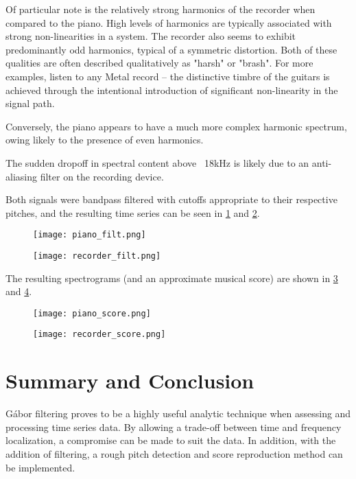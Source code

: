 \documentclass[journal]{IEEEtran}
\begin{document}
Of particular note is the relatively strong harmonics of the recorder when compared to the piano. High levels of harmonics
are typically associated with strong non-linearities in a system. The recorder also seems to exhibit predominantly
odd harmonics, typical of a symmetric distortion. Both of these qualities are often described qualitatively as 
"harsh" or "brash". For more examples, listen to any Metal record -- the distinctive timbre of the guitars is achieved
through the intentional introduction of significant non-linearity in the signal path.

Conversely, the piano appears to have a much more complex harmonic spectrum, owing likely to the presence of even
harmonics.

The sudden dropoff in spectral content above ~18kHz is likely due to an anti-aliasing filter on the recording device.

Both signals were bandpass filtered with cutoffs appropriate to their respective pitches, and the resulting time series can be seen in \ref{piano_filt} and \ref{recorder_filt}.
\begin{figure}
	\centerline{\texttt{[image: piano\_filt.png]}}
	\caption{}
	\label{piano_filt}
\end{figure}
\begin{figure}
	\centerline{\texttt{[image: recorder\_filt.png]}}
	\caption{}
	\label{recorder_filt}
\end{figure}

The resulting spectrograms (and an approximate musical score) are shown in \ref{piano_score} and \ref{recorder_score}.
\begin{figure}
	\centerline{\texttt{[image: piano\_score.png]}}
	\caption{}
	\label{piano_score}
\end{figure}
\begin{figure}
	\centerline{\texttt{[image: recorder\_score.png]}}
	\caption{}
	\label{recorder_score}
\end{figure}
 

\section{Summary and Conclusion}
G\'{a}bor filtering proves to be a highly useful analytic technique when assessing and processing time series data.
By allowing a trade-off between time and frequency localization, a compromise can be made to suit the data. In addition,
with the addition of filtering, a rough pitch detection and score reproduction method can be implemented.
\end{document}
